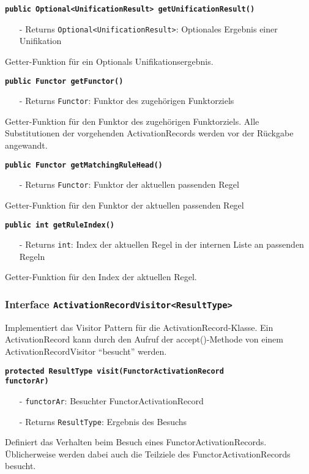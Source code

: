 \documentclass[parskip=full,11pt,twoside]{scrartcl}
\begin{document}
\textbf{\texttt{public Optional<UnificationResult> getUnificationResult()}}
\begin{itemize}[noitemsep]
	\item[-] Returns \texttt{Optional<UnificationResult>}: Optionales Ergebnis einer Unifikation
\end{itemize}
Getter-Funktion für ein Optionals Unifikationsergebnis.

\textbf{\texttt{public Functor getFunctor()}}
\begin{itemize}[noitemsep]
	\item[-] Returns \texttt{Functor}: Funktor des zugehörigen Funktorziels
\end{itemize}
Getter-Funktion für den Funktor des zugehörigen Funktorziels. Alle Substitutionen der vorgehenden ActivationRecords werden vor der Rückgabe angewandt. 

\textbf{\texttt{public Functor getMatchingRuleHead()}}
\begin{itemize}[noitemsep]
	\item[-] Returns \texttt{Functor}: Funktor der aktuellen passenden Regel
\end{itemize}
Getter-Funktion für den Funktor der aktuellen passenden Regel

\textbf{\texttt{public int getRuleIndex()}}
\begin{itemize}[noitemsep]
	\item[-] Returns \texttt{int}: Index der aktuellen Regel in der internen Liste an passenden Regeln 
\end{itemize}
Getter-Funktion für den Index der aktuellen Regel.

\subsubsection{Interface \texttt{ActivationRecordVisitor<ResultType>}}

Implementiert das Visitor Pattern für die ActivationRecord-Klasse. Ein ActivationRecord kann durch den Aufruf der accept()-Methode von einem ActivationRecordVisitor \enquote{besucht} werden.

\textbf{\texttt{protected ResultType visit(FunctorActivationRecord\\functorAr)}}
\begin{itemize}[noitemsep]
	\item[-] \texttt{functorAr}: Besuchter FunctorActivationRecord
	\item[-] Returns \texttt{ResultType}: Ergebnis des Besuchs
\end{itemize}
Definiert das Verhalten beim Besuch eines FunctorActivationRecords. Üblicherweise werden dabei auch die Teilziele des FunctorActivationRecords besucht.
\end{document}

